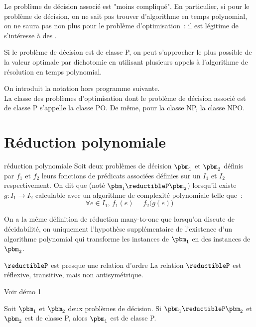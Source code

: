 \begin{adjustwidth}{-3cm}{-3cm}
Le problème de décision associé est "moins compliqué". En particulier, si pour le problème de décision, on ne sait pas trouver d'algorithme en temps polynomial, on ne saura pas non plus pour le problème d'optimisation~: il est légitime de s'intéresse à des .

\begin{remarque}{}{}
    Si le problème de décision est de classe P, on peut s'approcher le plus possible de la valeur optimale par dichotomie en utilisant plusieurs appels à l'algorithme de résolution en temps polynomial.
\end{remarque}
On introduit la notation hors programme suivante.\\
La classe des problèmes d'optimisation dont le problème de décision associé est de classe P s'appelle la classe PO.
De même, pour la classe NP, la classe NPO.

\section{Réduction polynomiale}


\begin{definition}{}{réduction polynomiale}
    Soit deux problèmes de décision $\pbm_1$ et $\pbm_2$ définis par $f_1$ et $f_2$ leurs fonctions de prédicats associées définies sur un $I_1$ et $I_2$ respectivement. On dit que  (noté $\pbm_1 \reductibleP \pbm_2$) lorsqu'il existe $g:I_1 \to I_2$ calculable avec un algorithme de complexité polynomiale telle que~:
    $$\forall e \in I_1,\, f_1(e) = f_2\Big(g(e)\Big)$$
\end{definition}

\begin{remarque}{}{}
    On a la même définition de réduction many-to-one que lorsqu'on discute de décidabilité, on uniquement l'hypothèse supplémentaire de l'existence d'un algorithme polynomial qui transforme les instances de $\pbm_1$ en des instances de $\pbm_2$.
\end{remarque}

\begin{proposition}{}{$\reductibleP$ est presque une relation d'ordre}
    La relation $\reductibleP$ est réflexive, transitive, mais non antisymétrique.
\end{proposition}
Voir démo 1

\begin{proposition}{}{}
    Soit $\pbm_1$ et $\pbm_2$ deux problèmes de décision. Si $\pbm_1 \reductibleP \pbm_2$ et $\pbm_2$ est de classe P, alors $\pbm_1$ est de classe P.
\end{proposition}


\end{adjustwidth}
